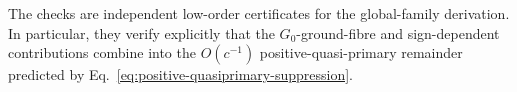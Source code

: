 \documentclass[11pt]{article}
\begin{document}
The checks are independent low-order certificates for the
global-family derivation.  In particular, they verify explicitly that
the \(G_0\)-ground-fibre and sign-dependent contributions combine into
the \(O(c^{-1})\) positive-quasi-primary remainder predicted by
Eq.~\eqref{eq:positive-quasiprimary-suppression}.
\end{document}
